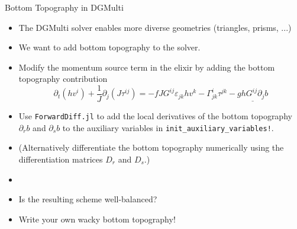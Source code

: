 \documentclass[handout,t,fleqn,leqno,aspectratio=1610,10pt]{beamer}
\begin{document}
\begin{frame}{Bottom Topography in DGMulti}
\begin{itemize}
    \item The DGMulti solver enables more diverse geometries (triangles, prisms, ...)
    \item We want to add bottom topography to the solver.
    \item  Modify the momentum source term in the elixir by adding the bottom topography contribution
    \begin{equation*}
    \partial_t (h v^i) + \frac{1}{J}\partial_j \left(J \tau^{ij}\right) = - f J G^{ij}\varepsilon_{jk} h v^k - \Gamma^i_{jk}\tau^{jk} - \underline{g h G^{ij}\partial_j b}
    \end{equation*}
    \item Use \texttt{ForwardDiff.jl} to add the local derivatives of the bottom topography $\partial_r b$ and $\partial_s b$ to the auxiliary variables in \texttt{init\_auxiliary\_variables!}.
    \item (Alternatively differentiate the bottom topography numerically using the differentiation matrices $D_r$ and $D_s$.)
    \item[]
    \item Is the resulting scheme well-balanced?
    \item Write your own wacky bottom topography!
\end{itemize}
\end{frame}
\end{document}
